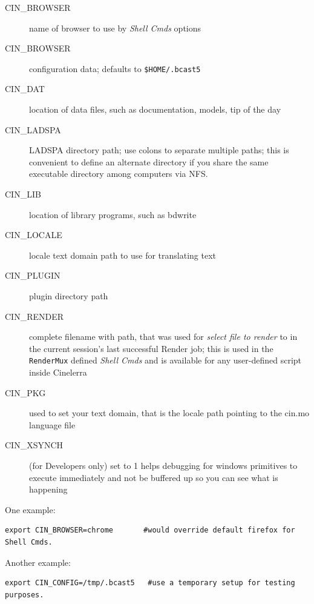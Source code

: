 \begin{description}
    \item[{\small CIN\_BROWSER}] name of browser to use by \textit{Shell Cmds} options
    \item[{\small CIN\_BROWSER}] configuration data; defaults to \texttt{\$HOME/.bcast5}
    \item[{\small CIN\_DAT}] location of data files, such as documentation, models, tip of the day
    \item[{\small CIN\_LADSPA}] LADSPA directory path; use colons to separate multiple paths; this is convenient to define an alternate directory if you share the same executable directory among computers via NFS.
    \item[{\small CIN\_LIB}] location of library programs, such as bdwrite
    \item[{\small CIN\_LOCALE}] locale text domain path to use for translating text
    \item[{\small CIN\_PLUGIN}] plugin directory path
    \item[{\small CIN\_RENDER}] complete filename with path, that was used for \textit{select file to render} to in the current session’s last successful Render job; this is used in the \texttt{RenderMux} defined \textit{Shell Cmds} and is available for any user-defined script inside Cinelerra
    \item[{\small CIN\_PKG}] used to set your text domain, that is the locale path pointing to the cin.mo language file
    \item[{\small CIN\_XSYNCH}] (for Developers only) set to 1 helps debugging for windows primitives to execute immediately and not be buffered up so you can see what is happening
\end{description}

One example:

\begin{lstlisting}[numbers=none]
export CIN_BROWSER=chrome       #would override default firefox for Shell Cmds.
\end{lstlisting}

Another example:

\begin{lstlisting}[numbers=none]
export CIN_CONFIG=/tmp/.bcast5   #use a temporary setup for testing purposes.
\end{lstlisting}

